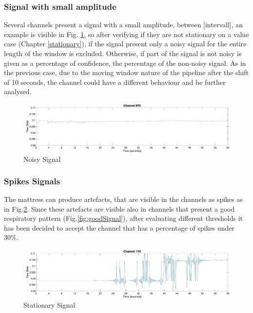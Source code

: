 \subsubsection*{Signal with small amplitude}\label{noisy}

Several channels present a signal with a small amplitude, between [intervall], an example is visible in Fig. \ref{fig:noisy}, so after verifying if they are not stationary on a value case (Chapter \ref{stationary}), if the signal present only a noisy signal for the entire length of the window is excluded. 
Otherwise, if part of the signal is not noisy is given as a percentage of confidence, the percentage of the non-noisy signal. 
As in the previous case, due to the moving window nature of the pipeline after the shift of 10 seconds, the channel could have a different behaviour and be further analysed.\\


\begin{figure}[H]
    \centering
    \includegraphics[width=\textwidth]{img/noisy.jpg}
    \caption{Noisy Signal}
    \label{fig:noisy}
\end{figure}


\subsubsection{Spikes Signals} \label{spikes}
The mattress can produce artefacts, that are visible in the channels as spikes as in Fig.\ref{fig:spikeTotal}. Since these artefacts are visible also in channels that present a good respiratory pattern (Fig.\ref{fig:goodSignal}), after evaluating different thresholds it has been decided to accept the channel that has a percentage of spikes under 30\%.\\


\begin{figure}[H]
    \centering
    \includegraphics[width=\textwidth]{img/spike_total.jpg}
    \caption{Stationary Signal}
    \label{fig:spikeTotal}
\end{figure}

